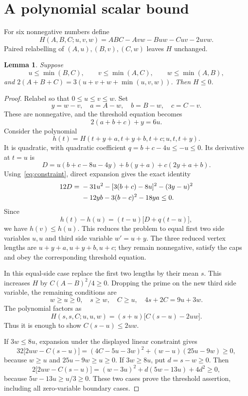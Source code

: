 \documentclass[11pt]{article}
\newtheorem{lemma}[theorem]{Lemma}
\begin{document}
\section{A polynomial scalar bound}
For six nonnegative numbers define
\[
 H(A,B,C;u,v,w)=ABC-Avw-Buw-Cuv-2uvw.
\]
Paired relabelling of $(A,u),(B,v),(C,w)$ leaves $H$ unchanged.
\begin{lemma}\label{lem:threshold}
Suppose
\[
 u\le\min(B,C),\qquad v\le\min(A,C),\qquad w\le\min(A,B),
\]
and $2(A+B+C)=3(u+v+w+\min(u,v,w))$. Then $H\le0$.
\end{lemma}
\begin{proof}
Relabel so that $0\le u\le v\le w$. Set
\[
 y=w-v,\quad a=A-w,\quad b=B-w,\quad c=C-v.
\]
These are nonnegative, and the threshold equation becomes
\begin{equation}\label{eq:constraint}
 2(a+b+c)+y=6u.
\end{equation}
Consider the polynomial
\[
 h(t)=H(t+y+a,t+y+b,t+c;u,t,t+y).
\]
It is quadratic, with quadratic coefficient $q=b+c-4u\le-u\le0$. Its derivative at $t=u$ is
\[
 D=u(b+c-8u-4y)+b(y+a)+c(2y+a+b).
\]
Using~\eqref{eq:constraint}, direct expansion gives the exact identity
\begin{align}
12D={}&-31u^2-[3(b+c)-8u]^2-(3y-u)^2\notag\\
 &-12yb-3(b-c)^2-18ya\le0.\label{eq:sos}
\end{align}
Since
\[
 h(t)-h(u)=(t-u)\bigl[D+q(t-u)\bigr],
\]
we have $h(v)\le h(u)$. This reduces the problem to equal first two side variables $u,u$ and third side variable $w'=u+y$. The three reduced vertex lengths are $u+y+a,u+y+b,u+c$; they remain nonnegative, satisfy the caps and obey the corresponding threshold equation.

In this equal-side case replace the first two lengths by their mean $s$. This increases $H$ by $C(A-B)^2/4\ge0$. Dropping the prime on the new third side variable, the remaining conditions are
\[
 w\ge u\ge0,\quad s\ge w,\quad C\ge u,\quad4s+2C=9u+3w.
\]
The polynomial factors as
\[
 H(s,s,C;u,u,w)=(s+u)\bigl[C(s-u)-2uw\bigr].
\]
Thus it is enough to show $C(s-u)\le2uw$.

If $3w\le8u$, expansion under the displayed linear constraint gives
\[
 32\bigl[2uw-C(s-u)\bigr]=(4C-5u-3w)^2+(w-u)(25u-9w)\ge0,
\]
because $w\ge u$ and $25u-9w\ge u\ge0$. If $3w\ge8u$, put $d=s-w\ge0$. Then
\[
 2\bigl[2uw-C(s-u)\bigr]=(w-3u)^2+d(5w-13u)+4d^2\ge0,
\]
because $5w-13u\ge u/3\ge0$. These two cases prove the threshold assertion, including all zero-variable boundary cases.
\end{proof}
\end{document}
